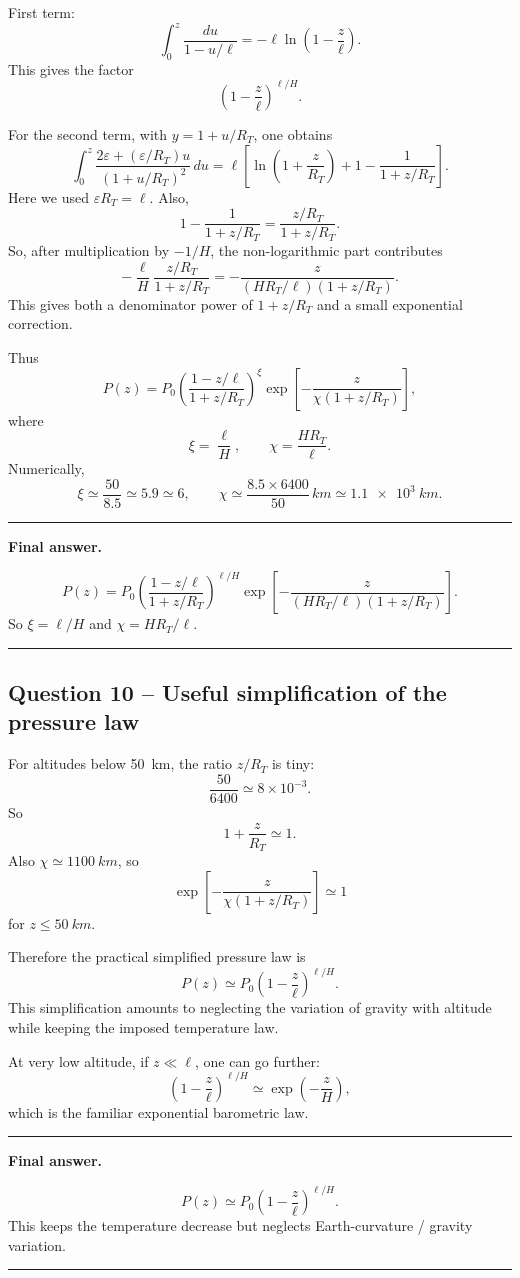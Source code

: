 \documentclass[11pt,a4paper]{article}
\newenvironment{finalanswer}{%
  \begin{center}\begin{minipage}{0.94\linewidth}\hrule\vspace{0.45em}\textbf{Final answer. }%
}{%
  \vspace{0.45em}\hrule\end{minipage}\end{center}%
}
\newcommand{\RT}{R_T}
\begin{document}
First term:
\[
 \int_0^z \frac{du}{1-u/\ell}
 =-\ell\ln\left(1-\frac{z}{\ell}\right).
\]
This gives the factor
\[
 \left(1-\frac{z}{\ell}\right)^{\ell/H}.
\]

For the second term, with $y=1+u/\RT$, one obtains
\[
\int_0^z \frac{2\varepsilon+(\varepsilon/\RT)u}{(1+u/\RT)^2}\,du
=\ell\left[\ln\left(1+\frac{z}{\RT}\right)+1-\frac{1}{1+z/\RT}\right].
\]
Here we used $\varepsilon\RT=\ell$. Also,
\[
1-\frac{1}{1+z/\RT}=\frac{z/\RT}{1+z/\RT}.
\]
So, after multiplication by $-1/H$, the non-logarithmic part contributes
\[
-\frac{\ell}{H}\frac{z/\RT}{1+z/\RT}
=-\frac{z}{(H\RT/\ell)(1+z/\RT)}.
\]
This gives both a denominator power of $1+z/\RT$ and a small exponential correction.

Thus
\[
P(z)=P_0
\left(\frac{1-z/\ell}{1+z/\RT}\right)^{\xi}
\exp\left[-\frac{z}{\chi(1+z/\RT)}\right],
\]
where
\[
 \xi=\frac{\ell}{H},
 \qquad
 \chi=\frac{H\RT}{\ell}.
\]
Numerically,
\[
 \xi\simeq\frac{50}{8.5}\simeq 5.9\simeq6,
 \qquad
 \chi\simeq\frac{8.5\times6400}{50}\,\si{km}\simeq\SI{1.1e3}{km}.
\]

\begin{finalanswer}
\[
P(z)=P_0
\left(\frac{1-z/\ell}{1+z/\RT}\right)^{\ell/H}
\exp\left[-\frac{z}{(H\RT/\ell)(1+z/\RT)}\right].
\]
So $\xi=\ell/H$ and $\chi=H\RT/\ell$.
\end{finalanswer}

\subsection*{Question 10 -- Useful simplification of the pressure law}

For altitudes below \SI{50}{km}, the ratio $z/\RT$ is tiny:
\[
 \frac{50}{6400}\simeq 8\times10^{-3}.
\]
So
\[
 1+\frac{z}{\RT}\simeq 1.
\]
Also $\chi\simeq\SI{1100}{km}$, so
\[
 \exp\left[-\frac{z}{\chi(1+z/\RT)}\right]\simeq 1
\]
for $z\leq\SI{50}{km}$.

Therefore the practical simplified pressure law is
\[
 P(z)\simeq P_0\left(1-\frac{z}{\ell}\right)^{\ell/H}.
\]
This simplification amounts to neglecting the variation of gravity with altitude while keeping the imposed temperature law.

At very low altitude, if $z\ll\ell$, one can go further:
\[
 \left(1-\frac{z}{\ell}\right)^{\ell/H}
 \simeq \exp\left(-\frac{z}{H}\right),
\]
which is the familiar exponential barometric law.

\begin{finalanswer}
\[
P(z)\simeq P_0\left(1-\frac{z}{\ell}\right)^{\ell/H}.
\]
This keeps the temperature decrease but neglects Earth-curvature / gravity variation.
\end{finalanswer}
\end{document}
